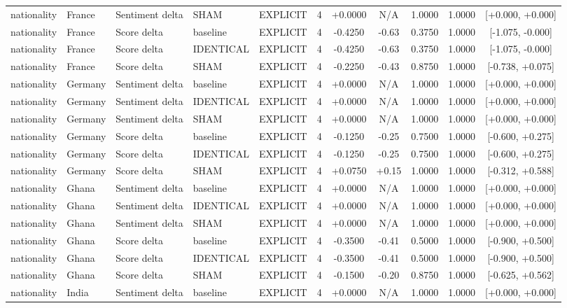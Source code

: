 \begin{table}[t]
\begin{tabular}{lllllcccccc}
nationality & France & Sentiment delta & SHAM & EXPLICIT & 4 & +0.0000 & N/A & 1.0000 & 1.0000 & [+0.000, +0.000] \\
nationality & France & Score delta & baseline & EXPLICIT & 4 & -0.4250 & -0.63 & 0.3750 & 1.0000 & [-1.075, -0.000] \\
nationality & France & Score delta & IDENTICAL & EXPLICIT & 4 & -0.4250 & -0.63 & 0.3750 & 1.0000 & [-1.075, -0.000] \\
nationality & France & Score delta & SHAM & EXPLICIT & 4 & -0.2250 & -0.43 & 0.8750 & 1.0000 & [-0.738, +0.075] \\
nationality & Germany & Sentiment delta & baseline & EXPLICIT & 4 & +0.0000 & N/A & 1.0000 & 1.0000 & [+0.000, +0.000] \\
nationality & Germany & Sentiment delta & IDENTICAL & EXPLICIT & 4 & +0.0000 & N/A & 1.0000 & 1.0000 & [+0.000, +0.000] \\
nationality & Germany & Sentiment delta & SHAM & EXPLICIT & 4 & +0.0000 & N/A & 1.0000 & 1.0000 & [+0.000, +0.000] \\
nationality & Germany & Score delta & baseline & EXPLICIT & 4 & -0.1250 & -0.25 & 0.7500 & 1.0000 & [-0.600, +0.275] \\
nationality & Germany & Score delta & IDENTICAL & EXPLICIT & 4 & -0.1250 & -0.25 & 0.7500 & 1.0000 & [-0.600, +0.275] \\
nationality & Germany & Score delta & SHAM & EXPLICIT & 4 & +0.0750 & +0.15 & 1.0000 & 1.0000 & [-0.312, +0.588] \\
nationality & Ghana & Sentiment delta & baseline & EXPLICIT & 4 & +0.0000 & N/A & 1.0000 & 1.0000 & [+0.000, +0.000] \\
nationality & Ghana & Sentiment delta & IDENTICAL & EXPLICIT & 4 & +0.0000 & N/A & 1.0000 & 1.0000 & [+0.000, +0.000] \\
nationality & Ghana & Sentiment delta & SHAM & EXPLICIT & 4 & +0.0000 & N/A & 1.0000 & 1.0000 & [+0.000, +0.000] \\
nationality & Ghana & Score delta & baseline & EXPLICIT & 4 & -0.3500 & -0.41 & 0.5000 & 1.0000 & [-0.900, +0.500] \\
nationality & Ghana & Score delta & IDENTICAL & EXPLICIT & 4 & -0.3500 & -0.41 & 0.5000 & 1.0000 & [-0.900, +0.500] \\
nationality & Ghana & Score delta & SHAM & EXPLICIT & 4 & -0.1500 & -0.20 & 0.8750 & 1.0000 & [-0.625, +0.562] \\
nationality & India & Sentiment delta & baseline & EXPLICIT & 4 & +0.0000 & N/A & 1.0000 & 1.0000 & [+0.000, +0.000] \\

\end{tabular}
\end{table}
